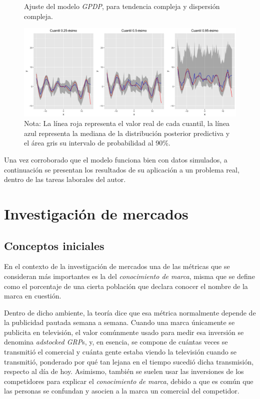 \begin{figure}[H]
	\centering
	\caption{Ajuste del modelo \textit{GPDP}, para tendencia compleja y dispersi\'on compleja.}
	\includegraphics[width=\textwidth]{Figures/Simulation/complex_g_complex_error/fitted_models.png}
	\captionsetup{singlelinecheck=off,font=footnotesize}
    \caption*{Nota: La l\'inea roja representa el valor real de cada cuantil, la l\'inea azul representa la mediana de la distribuci\'on posterior predictiva y el \'area gris su intervalo de probabilidad al 90\%.}
	\label{fitted_cgce}
\end{figure}

Una vez corroborado que el modelo funciona bien con datos simulados, a continuaci\'on se presentan los resultados de su aplicaci\'on a un problema real, dentro de las tareas laborales del autor.

\section{Investigaci\'on de mercados}

\subsection{Conceptos iniciales}

En el contexto de la investigaci\'on de mercados una de las m\'etricas que se consideran m\'as importantes es la del \textit{conocimiento de marca}, misma que se define como el porcentaje de una cierta poblaci\'on que declara conocer el nombre de la marca en cuesti\'on.

Dentro de dicho ambiente, la teor\'ia dice que esa m\'etrica normalmente depende de la publicidad pautada semana a semana. Cuando una marca \'unicamente se publicita en televisi\'on, el valor com\'unmente usado para medir esa inversi\'on se denomina \textit{adstocked GRP}s, y, en esencia, se compone de cu\'antas veces se transmiti\'o el comercial y cu\'anta gente estaba viendo la televisi\'on cuando se transmiti\'o,  ponderado por qu\'e tan lejana en el tiempo sucedi\'o dicha transmisi\'on, respecto al d\'ia de hoy. Asimismo, tambi\'en se suelen usar las inversiones de los competidores para explicar el \textit{conocimiento de marca}, debido a que es com\'un que las personas se confundan y asocien a la marca un comercial del competidor.

